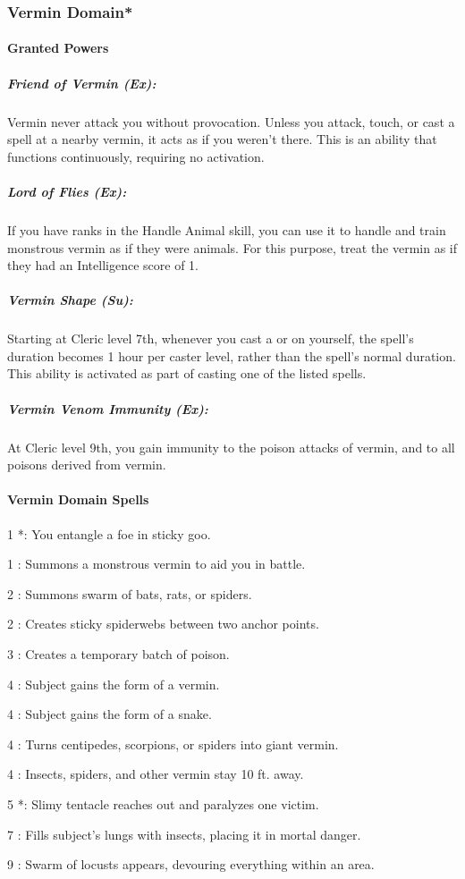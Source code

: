\subsubsection[Vermin Domain]{Vermin Domain*}
\paragraph{Granted Powers}
\subparagraph{Friend of Vermin (Ex):}
Vermin never attack you without provocation. Unless you attack, touch, or cast a spell at a nearby vermin, it acts as if you weren't there.
This is an ability that functions continuously, requiring no activation.
\subparagraph{Lord of Flies (Ex):}
If you have ranks in the Handle Animal skill, you can use it to handle and train monstrous vermin as if they were animals.
For this purpose, treat the vermin as if they had an Intelligence score of 1.
\subparagraph{Vermin Shape (Su):}
Starting at Cleric level 7th, whenever you cast a  or  on yourself, 
the spell's duration becomes 1 hour per caster level, rather than the spell's normal duration.
This ability is activated as part of casting one of the listed spells.
\subparagraph{Vermin Venom Immunity (Ex):}
At Cleric level 9th, you gain immunity to the poison attacks of vermin, and to all poisons derived from vermin.
\paragraph{Vermin Domain Spells}
\begin{list}{}{\leftmargin=1em}
\item[1] *: You entangle a foe in sticky goo.
\item[1] : Summons a monstrous vermin to aid you in battle.
\item[2] : Summons swarm of bats, rats, or spiders.
\item[2] : Creates sticky spiderwebs between two anchor points.
\item[3] : Creates a temporary batch of poison.
\item[4] : Subject gains the form of a vermin.
\item[4] : Subject gains the form of a snake.
\item[4] : Turns centipedes, scorpions, or spiders into giant vermin.
\item[4] : Insects, spiders, and other vermin stay 10 ft. away.
\item[5] *: Slimy tentacle reaches out and paralyzes one victim.
\item[7] : Fills subject's lungs with insects, placing it in mortal danger.
\item[9] : Swarm of locusts appears, devouring everything within an area.
\end{list}
